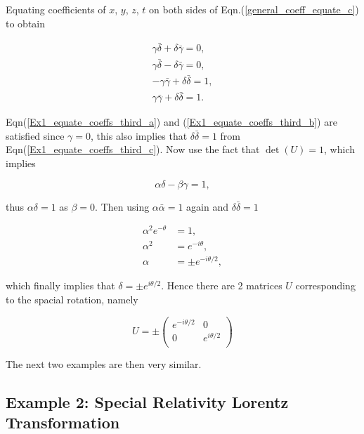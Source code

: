 \noindent Equating coefficients of $x$, $y$, $z$, $t$ on both sides of Eqn.(\ref{general_coeff_equate_c}) to obtain

\begin{subequations}
\begin{gather}\label{Ex1_equate_coeffs_third_a}
\gamma \bar{\delta} + \delta \bar{\gamma} = 0, \\\label{Ex1_equate_coeffs_third_b}
\gamma \bar{\delta} - \delta \bar{\gamma} = 0 ,\\\label{Ex1_equate_coeffs_third_c}
-\gamma \bar{\gamma} + \delta \bar{\delta} = 1 ,\\\label{Ex1_equate_coeffs_third_d}
\gamma \bar{\gamma} + \delta \bar{\delta} = 1. 
\end{gather}
\end{subequations}

\noindent Eqn(\ref{Ex1_equate_coeffs_third_a}) and (\ref{Ex1_equate_coeffs_third_b}) are satisfied since $\gamma = 0$, this also implies that $\delta \bar{\delta} = 1$ from Eqn(\ref{Ex1_equate_coeffs_third_c}). Now use the fact that $\det{(U)} = 1$, which implies

\begin{equation*}
\alpha \delta - \beta \gamma = 1,
\end{equation*}

\noindent thus $\alpha \delta = 1$ as $\beta = 0$. Then using $\alpha \bar{\alpha} = 1$ again and $\delta \bar{\delta} = 1$

\begin{align*}
\alpha^2 e^{-\theta} & = 1, \\
\alpha^2 & = e^{-i\theta}, \\
\alpha & = \pm e^{{-i\theta}/2}, 
\end{align*}

\noindent which finally implies that $\delta = \pm e^{i\theta/2}$. Hence there are 2 matrices $U$ corresponding to the spacial rotation, namely

\begin{equation*}
U = \pm
\left(
\begin{array}{cc}
e^{-i\theta/2} & 0            \\
0              & e^{i\theta/2} \\
\end{array}
\right)
\end{equation*}

\noindent The next two examples are then very similar.

\subsection{Example 2: Special Relativity Lorentz Transformation}\label{Special_Linear_Matrices_Example_2}

